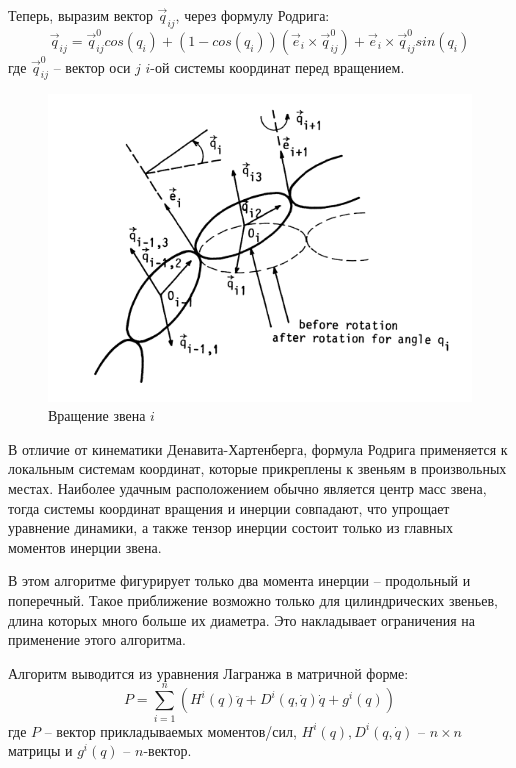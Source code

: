 Теперь, выразим вектор $\vec q_{ij}$, через формулу Родрига:
\begin{equation}
\vec q_{ij} = \vec q_{ij}^0 cos(q_i) + (1-cos(q_i)) (\vec e_{i} \times \vec q_{ij}^0) 
+ \vec e_{i} \times \vec q_{ij}^0 sin(q_i)
\end{equation}
где $\vec q_{ij}^0$ -- вектор оси $j$ $i$-ой системы координат перед вращением.

	\begin{figure}[H]
	\center\includegraphics[width=0.8\linewidth]{2.png}
	\caption{Вращение звена $i$}
	\label{fig:scr2}
	\end{figure}

В отличие от кинематики Денавита-Хартенберга, формула Родрига применяется к локальным системам координат, которые прикреплены к звеньям в произвольных местах.
Наиболее удачным расположением обычно является центр масс звена, тогда системы координат вращения и инерции совпадают, что упрощает уравнение динамики, а также тензор инерции состоит только из главных моментов инерции звена.

В этом алгоритме фигурирует только два момента инерции -- продольный и поперечный.
Такое приближение возможно только для цилиндрических звеньев, длина которых много больше их диаметра. Это накладывает ограничения на применение этого алгоритма.

Алгоритм выводится из уравнения Лагранжа в матричной форме:
\begin{equation}\label{eq4}
P = \sum_{i=1}^{n} 
\left(
H^i (q) \ddot q + D^i (q, \dot q) \dot q + g^i (q)
\right)
\end{equation}
где $P$ -- вектор прикладываемых моментов/сил, $H^i (q), D^i (q, \dot q)$ -- $n \times n$ матрицы и $g^i (q)$ -- $n$-вектор.

